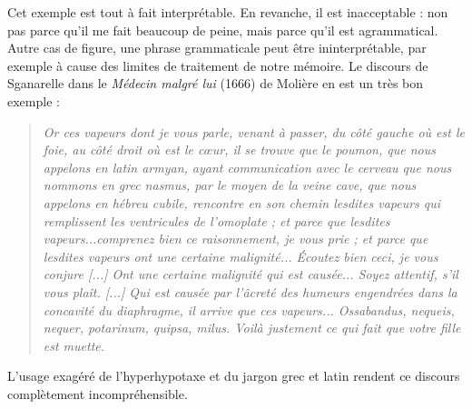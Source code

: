 Cet exemple est tout à fait interprétable. En revanche, il est inacceptable : non pas parce qu’il me fait beaucoup de peine, mais parce qu’il est agrammatical. Autre cas de figure, une phrase grammaticale peut être ininterprétable, par exemple à cause des limites de traitement de notre mémoire. Le discours de Sganarelle dans le \textit{Médecin malgré lui} (1666) de Molière en est un très bon exemple :
\begin{quote}\small\itshape
Or ces vapeurs dont je vous parle, venant à passer, du côté gauche où est le foie, au côté droit où est le cœur, il se trouve que le poumon, que nous appelons en latin armyan, ayant communication avec le cerveau que nous nommons en grec nasmus, par le moyen de la veine cave, que nous appelons en hébreu cubile, rencontre en son chemin lesdites vapeurs qui remplissent les ventricules de l’omoplate ; et parce que lesdites vapeurs...comprenez bien ce raisonnement, je vous prie ; et parce que lesdites vapeurs ont une certaine malignité... Écoutez bien ceci, je vous conjure [...] Ont une certaine malignité qui est causée... Soyez attentif, s’il vous plaît. [...] Qui est causée par l’âcreté des humeurs engendrées dans la concavité du diaphragme, il arrive que ces vapeurs... Ossabandus, nequeis, nequer, potarinum, quipsa, milus. Voilà justement ce qui fait que votre fille est muette.
\end{quote}

L’usage exagéré de l’hyperhypotaxe et du jargon grec et latin rendent ce discours complètement incompréhensible.


